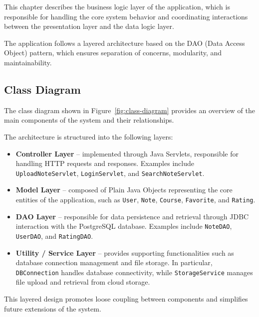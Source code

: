 \documentclass[12pt, a4paper]{article}
\begin{document}
    This chapter describes the business logic layer of the application, which is responsible
    for handling the core system behavior and coordinating interactions between the presentation
    layer and the data logic layer.

    The application follows a layered architecture based on the DAO (Data Access Object) pattern,
    which ensures separation of concerns, modularity, and maintainability.

    \subsection{Class Diagram}

    The class diagram shown in Figure~\ref{fig:class-diagram} provides an overview of the
    main components of the system and their relationships.

    The architecture is structured into the following layers:

    \begin{itemize}
        \item \textbf{Controller Layer} -- implemented through Java Servlets, responsible for handling HTTP requests and responses. Examples include \texttt{UploadNoteServlet}, \texttt{LoginServlet}, and \texttt{SearchNoteServlet}.

        \item \textbf{Model Layer} -- composed of Plain Java Objects representing the core entities of the application, such as \texttt{User}, \texttt{Note}, \texttt{Course}, \texttt{Favorite}, and \texttt{Rating}.

        \item \textbf{DAO Layer} -- responsible for data persistence and retrieval through JDBC interaction with the PostgreSQL database. Examples include \texttt{NoteDAO}, \texttt{UserDAO}, and \texttt{RatingDAO}.

        \item \textbf{Utility / Service Layer} -- provides supporting functionalities such as database connection management and file storage. In particular, \texttt{DBConnection} handles database connectivity, while \texttt{StorageService} manages file upload and retrieval from cloud storage.
    \end{itemize}

    This layered design promotes loose coupling between components and simplifies future
    extensions of the system.
\end{document}
